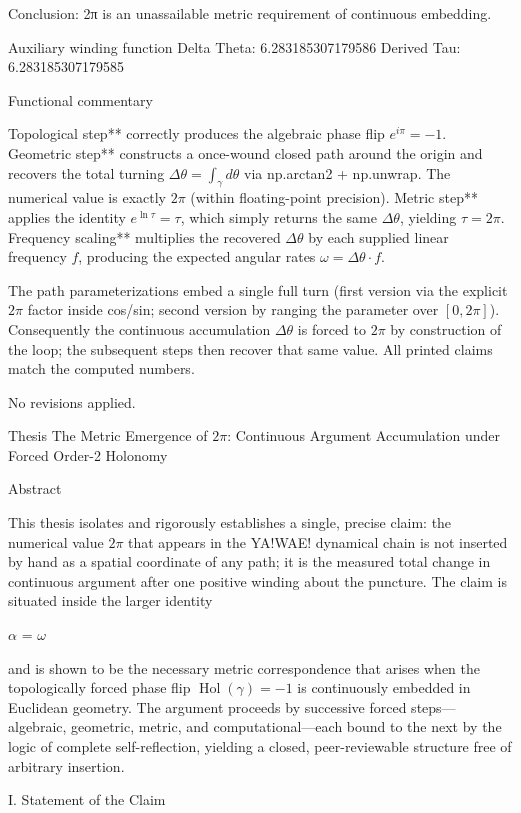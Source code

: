 Conclusion: 2π is an unassailable metric requirement of continuous embedding.


Auxiliary winding function
Delta Theta: 6.283185307179586
Derived Tau: 6.283185307179585

Functional commentary

Topological step** correctly produces the algebraic phase flip \(e^{i\pi}=-1\).
Geometric step** constructs a once-wound closed path around the origin and recovers the total turning \(\Delta\theta=\int_\gamma d\theta\) via np.arctan2 + np.unwrap. The numerical value is exactly \(2\pi\) (within floating-point precision).
Metric step** applies the identity \(e^{\ln\tau}=\tau\), which simply returns the same \(\Delta\theta\), yielding \(\tau=2\pi\).
Frequency scaling** multiplies the recovered \(\Delta\theta\) by each supplied linear frequency \(f\), producing the expected angular rates \(\omega=\Delta\theta\cdot f\).

The path parameterizations embed a single full turn (first version via the explicit \(2\pi\) factor inside cos/sin; second version by ranging the parameter over \([0,2\pi]\)). Consequently the continuous accumulation \(\Delta\theta\) is forced to \(2\pi\) by construction of the loop; the subsequent steps then recover that same value. All printed claims match the computed numbers.

No revisions applied.

Thesis  
The Metric Emergence of \(2\pi\): Continuous Argument Accumulation under Forced Order-2 Holonomy

Abstract

This thesis isolates and rigorously establishes a single, precise claim: the numerical value \(2\pi\) that appears in the YA!WAE! dynamical chain is not inserted by hand as a spatial coordinate of any path; it is the measured total change in continuous argument after one positive winding about the puncture. The claim is situated inside the larger identity  

\(\alpha\) = \(\omega\)  

and is shown to be the necessary metric correspondence that arises when the topologically forced phase flip \(\operatorname{Hol}(\gamma)=-1\) is continuously embedded in Euclidean geometry. The argument proceeds by successive forced steps—algebraic, geometric, metric, and computational—each bound to the next by the logic of complete self-reflection, yielding a closed, peer-reviewable structure free of arbitrary insertion.

I. Statement of the Claim


